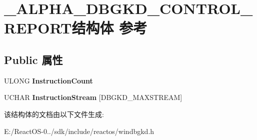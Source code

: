 \hypertarget{struct___a_l_p_h_a___d_b_g_k_d___c_o_n_t_r_o_l___r_e_p_o_r_t}{}\section{\+\_\+\+A\+L\+P\+H\+A\+\_\+\+D\+B\+G\+K\+D\+\_\+\+C\+O\+N\+T\+R\+O\+L\+\_\+\+R\+E\+P\+O\+R\+T结构体 参考}
\label{struct___a_l_p_h_a___d_b_g_k_d___c_o_n_t_r_o_l___r_e_p_o_r_t}
\subsection*{Public 属性}
\begin{DoxyCompactItemize}
\item 
\mbox{\label{struct___a_l_p_h_a___d_b_g_k_d___c_o_n_t_r_o_l___r_e_p_o_r_t_a5d783f76a28590f2edd41cd7b1e6d15d}} 
U\+L\+O\+NG {\bfseries Instruction\+Count}
\item 
\mbox{\label{struct___a_l_p_h_a___d_b_g_k_d___c_o_n_t_r_o_l___r_e_p_o_r_t_a797444a610ee429fe7f1ad4f45ea8ca7}} 
U\+C\+H\+AR {\bfseries Instruction\+Stream} \mbox{[}D\+B\+G\+K\+D\+\_\+\+M\+A\+X\+S\+T\+R\+E\+AM\mbox{]}
\end{DoxyCompactItemize}


该结构体的文档由以下文件生成\+:\begin{DoxyCompactItemize}
\item 
E\+:/\+React\+O\+S-\/0../sdk/include/reactos/windbgkd.\+h\end{DoxyCompactItemize}
